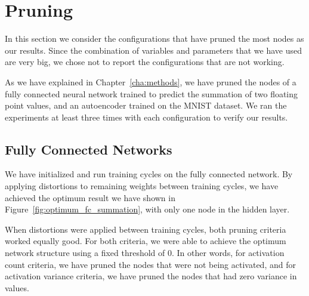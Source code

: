 \section{Pruning}
In this section we consider the configurations that have pruned the most nodes as our results. Since the combination of variables and parameters that we have used are very big, we chose not to report the configurations that are not working. 

As we have explained in Chapter~\ref{cha:methods}, we have pruned the nodes of a fully connected neural network trained to predict the summation of two floating point values, and an autoencoder trained on the MNIST dataset. We ran the experiments at least three times with each configuration to verify our results.

\subsection{Fully Connected Networks}
We have initialized and run training cycles on the fully connected network. By applying distortions to remaining weights between training cycles, we have achieved the optimum result we have shown in Figure~\ref{fig:optimum_fc_summation}, with only one node in the hidden layer. 

When distortions were applied between training cycles, both pruning criteria worked equally good. For both criteria, we were able to achieve the optimum network structure using a fixed threshold of $0$. In other words, for activation count criteria, we have pruned the nodes that were not being activated, and for activation variance criteria, we have pruned the nodes that had zero variance in values.

